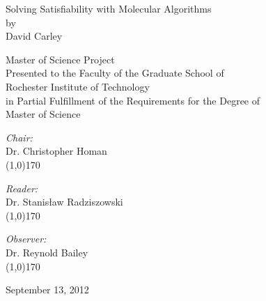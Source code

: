 \begin{titlepage}

	\begin{center}
	
		{\LARGE Solving {\sc Satisfiability} with Molecular Algorithms}\\[1.5cm]
		by\\
		\vspace{0.5cm}
		{\large David Carley}\\

		\vspace{1cm}
		
{\large Master of Science Project}\\
				\vspace{0.5cm}
Presented to the Faculty of the Graduate School of\\
		\vspace{0.5cm}				
Rochester Institute of Technology\\
		\vspace{0.5cm}
in Partial Fulfillment of the Requirements for the Degree of\\
		\vspace{0.5cm}
{\large Master of Science}
		
		\vspace{1cm}
		
		\begin{minipage}{0.4\textwidth}
			\begin{flushleft} \large

			\end{flushleft}
			\end{minipage}
			\begin{minipage}{0.4\textwidth}
			\begin{flushleft} \large

				\emph{Chair:} \\
				Dr. Christopher Homan
				\vspace{1cm}\\
				\line(1,0){170}\\
				\vspace{0.2cm}

				\emph{Reader:} \\
				Dr. Stanis\l aw Radziszowski
				\vspace{1cm}\\
				\line(1,0){170}\\
				\vspace{0.2cm}
				
				\emph{Observer:} \\
				Dr. Reynold Bailey
				\vspace{1cm}\\
				\line(1,0){170}
				
			\end{flushleft}
		\end{minipage}
	
		\vfill
		
		{\large September 13, 2012}
	
	\end{center}

\end{titlepage}